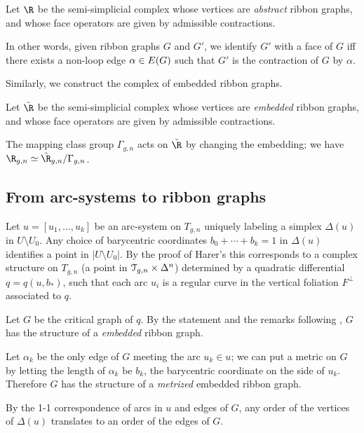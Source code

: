 \begin{definition}
  \label{dfn:rg-complex}
  Let $\R$ be the semi-simplicial complex whose vertices are
  \emph{abstract} ribbon graphs, and whose face operators are given by
  admissible contractions.
\end{definition}
In other words, given ribbon graphs $G$ and $G'$, we identify $G'$
with a face of $G$ iff there exists a non-loop edge $\alpha \in E(G)$
such that $G'$ is the contraction of $G$ by $\alpha$.

Similarly, we construct the complex of embedded ribbon graphs.
\begin{definition}
  \label{dfn:erg-complex}
  Let $\tilde\R$ be the semi-simplicial complex whose vertices are
  \emph{embedded} ribbon graphs, and whose face operators are given by
  admissible contractions.
\end{definition}

The mapping class group $\Gamma_{g,n}$ acts on $\tilde\R$ by changing the
embedding; we have $\R_{g,n} \simeq \tilde\R_{g,n} / \Gamma_{g,n}$.


\subsection{From arc-systems to ribbon graphs}
\label{sec:arcs-to-rg}

Let $u = [u_1, \ldots, u_k]$ be an arc-system on $T_{g,n}$ uniquely
labeling a simplex $\Delta(u)$ in $U \setminus U_0$.  Any choice of barycentric
coordinates $b_0 + \cdots + b_k = 1$ in $\Delta(u)$ identifies a point in $|U \setminus
U_0|$.  By the proof of Harer's  this corresponds to a
complex structure on $T_{g,n}$ (a point in $\mathcal{T}_{g,n} \times \Delta^n$)
determined by a quadratic differential $q = q(u, b_*)$, such that each
arc $u_i$ is a regular curve in the vertical foliation $F^\perp$
associated to $q$.

Let $G$ be the critical graph of $q$.  By the statement and the
remarks following , $G$ has the structure of a
\emph{embedded} ribbon graph.

Let $\alpha_k$ be the only edge of $G$ meeting the arc $u_k \in u$; we can
put a metric on $G$ by letting the length of $\alpha_k$ be $b_k$, the
barycentric coordinate on the side of $u_k$.  Therefore $G$ has the
structure of a \emph{metrized} embedded ribbon graph.

By the 1-1 correspondence of arcs in $u$ and edges of $G$, any order
of the vertices of $\Delta(u)$ translates to an order of the edges of $G$.

